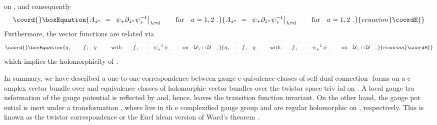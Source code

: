 \documentclass[a4paper,11pt,english]{article}
\numberwithin{equation}{section}
\renewcommand{\=}{\ =\ }
\begin{document}
on \coordHE{}, and consequently
\begin{equation}\coord{}\boxEquation{\label{eqfa}
 {A}_{\bar{z}^a}\=\left.\psi_+\partial_{\bar{z}^a}\psi^{-1}_+
 \right|_{\lambda=0}\qquad\text{for}\quad a=1,2\ .
}{{A}_{\bar{z}^a}\=\left.\psi_+\partial_{\bar{z}^a}\psi^{-1}_+
 \right|_{\lambda=0}\qquad\text{for}\quad a=1,2\ .
}{ecuacion}\coordE{}\end{equation}
Furthermore, the vector functions \myHighlight{$\eta_\pm$}\coordHE{} are related via 
\begin{equation}\coord{}\boxEquation{
 \eta_+\=f_{+-}\,\eta_- \qquad\text{with}\qquad f_{+-}\=\psi^{-1}_+\,\psi_-
 \qquad\text{on}\quad \mathcal{U}_+\cap\mathcal{U}_-\ ,
}{
 \eta_+\=f_{+-}\,\eta_- \qquad\text{with}\qquad f_{+-}\=\psi^{-1}_+\,\psi_-
 \qquad\text{on}\quad \mathcal{U}_+\cap\mathcal{U}_-\ ,
}{ecuacion}\coordE{}\end{equation}
which implies the holomorphicity of \coordHE{}.

In summary, we have described a one-to-one correspondence between gauge e%
quivalence classes of self-dual connection \coordHE{}-forms \coordHE{} on a c%
omplex vector bundle \coordHE{} over \coordHE{}  and equivalence classes of %
holomorphic vector bundles \coordHE{} over the twistor space \coordHE{} triv%
ial on \coordHE{}. A local gauge tra%
nsformation of the gauge potential \coordHE{} is reflected by 
\coordHE{} and, hence, leaves the %
 transition function \coordHE{} invariant. On the other hand, the gauge pot%
ential \coordHE{} is inert under a transformation \coordHE{}, where \coordHE{} live in th%
e complexified gauge group and are regular holomorphic on \coordHE{}, 
respectively. This is known as the twistor correspondence or the Eucl%
idean version of Ward's theorem \cite{Atiyah:1977pw,WardWells}.


\vfill\eject
\end{document}
